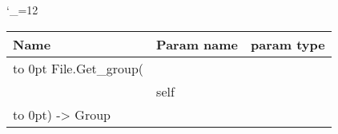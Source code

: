 \begingroup \catcode`\_=12 \tt
\begin{tabular}{lll}
\toprule
\textrm{Name}&\textrm{Param name}&\textrm{param type}\\
\midrule
\hbox to 0pt {File.Get_group(\hss}\\
& self\\
\hbox to 0pt{) -> Group\hss}\\
\bottomrule
\end{tabular}
\endgroup
